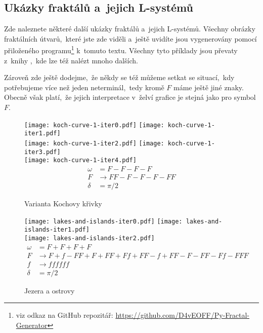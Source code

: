 \subsection{Ukázky fraktálů a~jejich L-systémů}\label{subsec:ukazky-fraktalu-lsystemy}

Zde naleznete některé další ukázky fraktálů a~jejich L-systémů. Všechny obrázky fraktálních útvarů,~které jste zde viděli a~ještě uvidíte jsou vygenerovány pomocí přiloženého programu\footnote{viz odkaz na GitHub repozitář: \url{https://github.com/D4vEOFF/Py-Fractal-Generator}} k~tomuto textu. Všechny tyto příklady jsou převaty z~knihy \cite{Prusinkiewicz1990},~kde lze též nalézt mnoho dalších.

Zároveň zde ještě dodejme,~že někdy se též můžeme setkat se situací,~kdy potřebujeme více než jeden neterminál,~tedy kromě $F$ máme ještě jiné znaky. Obecně však platí,~že jejich interpretace v~želví grafice je stejná jako pro symbol $F$.
\begin{figure}[H]
    \centering
    \texttt{[image: koch-curve-1-iter0.pdf]}\qquad
    \texttt{[image: koch-curve-1-iter1.pdf]}\qquad\\
    \texttt{[image: koch-curve-1-iter2.pdf]}\qquad
    \texttt{[image: koch-curve-1-iter3.pdf]}\qquad\\
    \texttt{[image: koch-curve-1-iter4.pdf]}\qquad
    \begin{align*}
        \omega&=F-F-F-F\\
        F&\to FF-F-F-F-FF\\
        \delta&=\pi/2
    \end{align*}
    \caption{Varianta Kochovy křivky}
    \label{fig:lsystem-varianta-kochovy-krivky}
\end{figure}
\begin{figure}
    \centering
    \texttt{[image: lakes-and-islands-iter0.pdf]}\qquad
    \texttt{[image: lakes-and-islands-iter1.pdf]}\qquad\\
    \texttt{[image: lakes-and-islands-iter2.pdf]}
    \begin{align*}
        \omega&=F+F+F+F\\
        F&\to F+f-FF+F+FF+Ff+FF-f+FF-F-FF-Ff-FFF\\
        f&\to ffffff\\
        \delta&=\pi/2
    \end{align*}
    \caption{Jezera a ostrovy}
    \label{fig:lsystem-jezera-a-ostrovy}
\end{figure}
